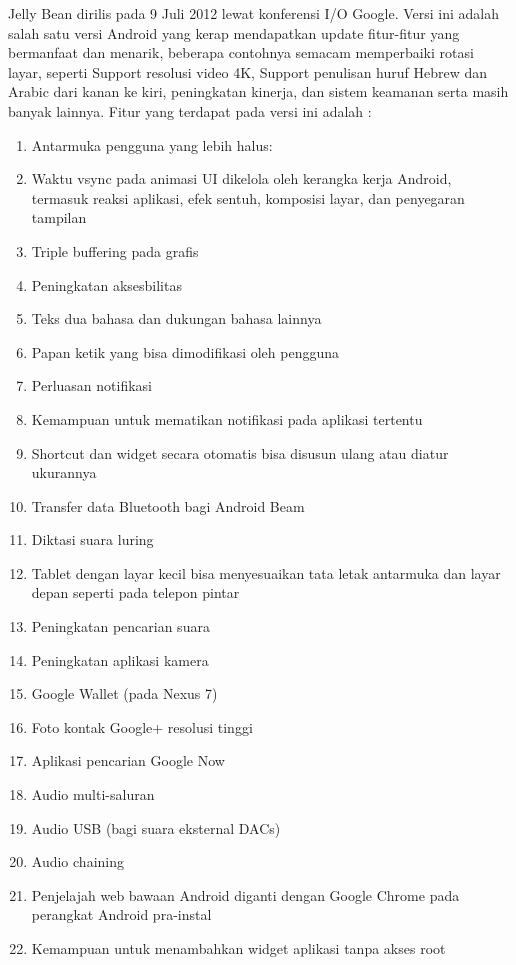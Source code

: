 \begin{enumerate}
Jelly Bean dirilis pada 9 Juli 2012 lewat konferensi I/O Google. Versi ini adalah salah satu versi Android yang kerap mendapatkan update fitur-fitur yang bermanfaat dan menarik, beberapa contohnya semacam memperbaiki rotasi layar, seperti Support resolusi video 4K, Support penulisan huruf Hebrew dan Arabic dari kanan ke kiri, peningkatan kinerja, dan sistem keamanan serta masih banyak lainnya. Fitur yang terdapat pada versi ini adalah : 
\begin{enumerate}
    \item Antarmuka pengguna yang lebih halus:
    \item Waktu vsync pada animasi UI dikelola oleh kerangka kerja Android, termasuk reaksi aplikasi, efek sentuh, komposisi layar, dan penyegaran tampilan
    \item Triple buffering pada grafis
    \item Peningkatan aksesbilitas
    \item Teks dua bahasa dan dukungan bahasa lainnya
    \item Papan ketik yang bisa dimodifikasi oleh pengguna
    \item Perluasan notifikasi
    \item Kemampuan untuk mematikan notifikasi pada aplikasi tertentu
    \item Shortcut dan widget secara otomatis bisa disusun ulang atau diatur ukurannya
    \item Transfer data Bluetooth bagi Android Beam
    \item Diktasi suara luring
    \item Tablet dengan layar kecil bisa menyesuaikan tata letak antarmuka dan layar depan seperti pada telepon pintar
    \item Peningkatan pencarian suara
    \item Peningkatan aplikasi kamera
    \item Google Wallet (pada Nexus 7)
    \item Foto kontak Google+ resolusi tinggi
    \item Aplikasi pencarian Google Now
    \item Audio multi-saluran
    \item Audio USB (bagi suara eksternal DACs)
    \item Audio chaining
    \item Penjelajah web bawaan Android diganti dengan Google Chrome pada perangkat Android pra-instal
    \item Kemampuan untuk menambahkan widget aplikasi tanpa akses root
\end{enumerate}


\end{enumerate}
